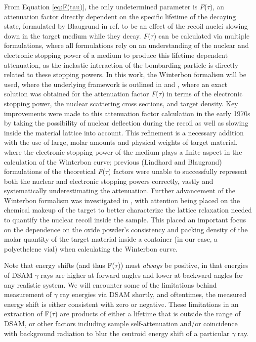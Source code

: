 From Equation \ref{eq:F(tau)}, the only undetermined parameter is \textit{F}(\textit{$\tau$}), an attenuation factor directly dependent on the specific lifetime of the decaying state, formulated by Blaugrund in ref. \cite{BLAUGRUND_DSAM_1966} to be an effect of the recoil nuclei slowing down in the target medium while they decay. \textit{F}(\textit{$\tau$}) can be calculated via multiple formulations, where all formulations rely on an understanding of the nuclear and electronic stopping power of a medium to produce this lifetime dependent attenuation, as the inelastic interaction of the bombarding particle is directly related to these stopping powers. In this work, the Winterbon formalism will be used, where the underlying framework is outlined in \cite{WINTERBON_1975} and \cite{Belgya_DSAM1996}, where an exact solution was obtained for the attenuation factor \textit{F}(\textit{$\tau$}) in terms of the electronic stopping power, the nuclear scattering cross sections, and target density. Key improvements were made to this attenuation factor calculation in the early 1970s by taking the possibility of nuclear deflection during the recoil as well as slowing inside the material lattice into account. This refinement is a necessary addition with the use of large, molar amounts and physical weights of target material, where the electronic stopping power of the medium plays a finite aspect in the calculation of the Winterbon curve; previous (Lindhard and Blaugrand) formulations of the theoretical \textit{F}(\textit{$\tau$}) factors were unable to successfully represent both the nuclear and electronic stopping powers correctly, vastly and systematically underestimating the attenuation. Further advancement of the Winterbon formalism was investigated in \cite{PETERS_DSAM2013}, with attention being placed on the chemical makeup of the target to better characterize the lattice relaxation needed to quantify the nuclear recoil inside the sample. This placed an important focus on the dependence on the oxide powder's consistency and packing density of the molar quantity of the target material inside a container (in our case, a polyethelene vial) when calculating the Winterbon curve.

Note that energy shifts (and thus F($\tau$)) must \textit{always} be positive, in that energies of DSAM $\gamma$ rays are higher at forward angles and lower at backward angles for any realistic system. We will encounter some of the limitations behind measurement of $\gamma$ ray energies via DSAM shortly, and oftentimes, the measured energy shift is either consistent with zero or negative. These limitations in an extraction of F($\tau$) are products of either a lifetime that is outside the range of DSAM, or other factors including sample self-attenuation and/or coincidence with background radiation to blur the centroid energy shift of a particular $\gamma$ ray.


